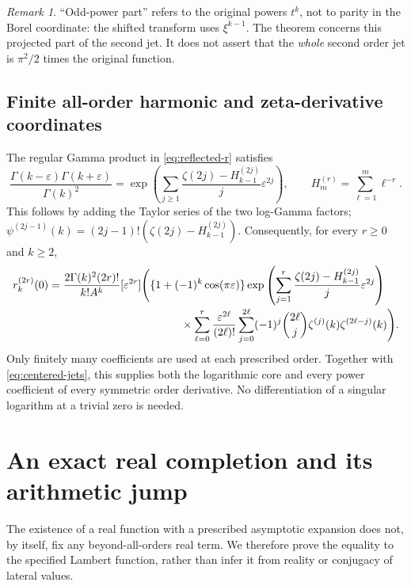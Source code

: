 \documentclass[11pt,a4paper]{article}
\numberwithin{equation}{section}
\theoremstyle{definition}\newtheorem{definition}[theorem]{Definition}
\theoremstyle{remark}\newtheorem{remark}[theorem]{Remark}
\newcommand{\eps}{\varepsilon}
\begin{document}
\begin{remark}
``Odd-power part'' refers to the original powers $t^k$, not to parity
in the Borel coordinate: the shifted transform uses $\xi^{k-1}$.
The theorem concerns this projected part of the second jet. It does not
assert that the \emph{whole} second order jet is $\pi^2/2$ times the
original function.
\end{remark}

\subsection{Finite all-order harmonic and zeta-derivative coordinates}
The regular Gamma product in \eqref{eq:reflected-r} satisfies
\begin{equation}\label{eq:gamma-product-jets}
 \frac{\Gamma(k-\eps)\Gamma(k+\eps)}{\Gamma(k)^2}
 =\exp\left(\sum_{j\ge1}
 \frac{\zeta(2j)-H_{k-1}^{(2j)}}j\eps^{2j}\right),
 \qquad H_m^{(r)}=\sum_{\ell=1}^m\ell^{-r}.
\end{equation}
This follows by adding the Taylor series of the two log-Gamma factors;
$\psi^{(2j-1)}(k)=(2j-1)!(\zeta(2j)-H_{k-1}^{(2j)})$.
Consequently, for every $r\ge0$ and $k\ge2$,
\begin{align}
 r_k^{(2r)}(0)
 &=\frac{2\Gamma(k)^2(2r)!}{k!A^k}[\eps^{2r}]
 \Bigg(\{1+(-1)^k\cos(\pi\eps)\}
 \exp\left(\sum_{j=1}^{r}
 {\zeta(2j)-H_{k-1}^{(2j)}\over j}\eps^{2j}\right)
 \nonumber\\[-2pt]
 &\hspace{42mm}\times
 \sum_{\ell=0}^{r}\frac{\eps^{2\ell}}{(2\ell)!}
 \sum_{j=0}^{2\ell}(-1)^j\binom{2\ell}{j}
 \zeta^{(j)}(k)\zeta^{(2\ell-j)}(k)\Bigg).
 \label{eq:all-coefficient-jets}
\end{align}
Only finitely many coefficients are used at each prescribed order.
Together with \eqref{eq:centered-jets}, this supplies both the logarithmic
core and every power coefficient of every symmetric order derivative.
No differentiation of a singular logarithm at a trivial zero is needed.

\section{An exact real completion and its arithmetic jump}
\label{sec:median}
The existence of a real function with a prescribed asymptotic expansion
does not, by itself, fix any beyond-all-orders real term. We therefore
prove the equality to the specified Lambert function, rather than infer
it from reality or conjugacy of lateral values.
\end{document}
